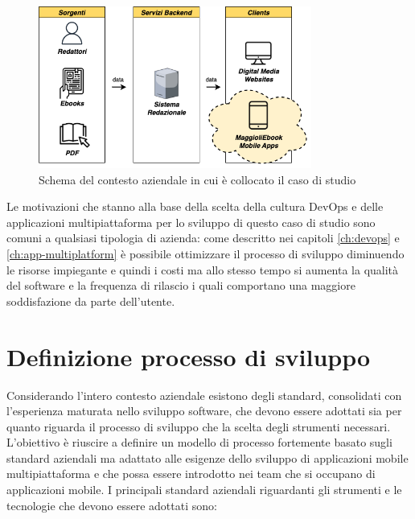 \begin{figure}[H]
    \centering
    \includegraphics[width=0.8\textwidth]{img/contesto-aziendale.png}
    \caption{Schema del contesto aziendale in cui è collocato il caso di studio}
    \label{contesto-aziendale-fig}
\end{figure}

Le motivazioni che stanno alla base della scelta della cultura DevOps e delle applicazioni multipiattaforma per lo sviluppo di questo caso di studio sono comuni a qualsiasi tipologia di azienda: come descritto nei capitoli \ref{ch:devops} e \ref{ch:app-multiplatform} è possibile ottimizzare il processo di sviluppo diminuendo le risorse impiegante e quindi i costi ma allo stesso tempo si aumenta la qualità del software e la frequenza di rilascio i quali comportano una maggiore soddisfazione da parte dell'utente.

\section{Definizione processo di sviluppo}
Considerando l'intero contesto aziendale esistono degli standard, consolidati con l'esperienza maturata nello sviluppo software, che devono essere adottati sia per quanto riguarda il processo di sviluppo che la scelta degli strumenti necessari. L'obiettivo è riuscire a definire un modello di processo fortemente basato sugli standard aziendali ma adattato alle esigenze dello sviluppo di applicazioni mobile multipiattaforma e che possa essere introdotto nei team che si occupano di applicazioni mobile. I principali standard aziendali riguardanti gli strumenti e le tecnologie che devono essere adottati sono:

